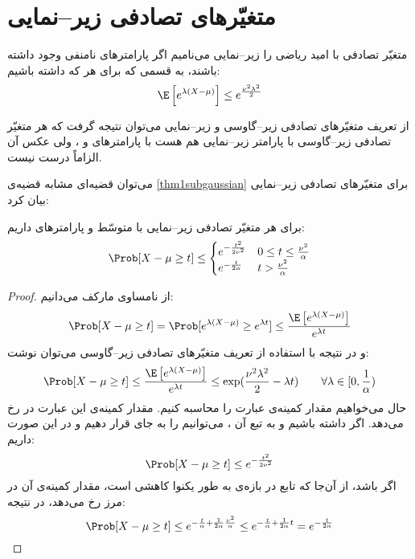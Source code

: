 	\section{متغیّرهای تصادفی زیر--نمایی}
	\begin{den}
		متغیّر تصادفی
		با امید ریاضی
		\lr{$\mu = \E[X]$}
		را زیر--نمایی می‌نامیم اگر پارامترهای نامنفی
		\lr{$(\nu,\alpha)$}
		وجود داشته باشند، به قسمی که برای هر
		\lr{$\lambda$}
		که
		داشته باشیم:
		\[\E\left[e^{\lambda(X-\mu)}\right]\leq e^{\frac{\nu^2\lambda^2}{2}}\]
	\end{den}
	از تعریف متغیّرهای تصادفی زیر--گاوسی و زیر--نمایی می‌توان نتیجه گرفت که هر متغیّر تصادفی زیر--گاوسی با پارامتر
	\lr{$\sigma$}
	زیر--نمایی هم هست با پارامترهای
	\lr{$\nu=\sigma$}
	و
	،
	ولی عکس آن الزاماً درست نیست.
	
	می‌توان قضیه‌ای مشابه قضیه‌ی
	\ref{thm1subgaussian}
	برای متغیّرهای تصادفی زیر--نمایی بیان کرد:
	\begin{thm}
		برای هر متغیّر تصادفی زیر--نمایی با متوسّط
		\lr{$\mu = \E[X]$}
		و پارامترهای
		\lr{$\nu,\alpha$}
		داریم:
		\begin{equation}
		\Prob[X-\mu\geq t] \leq \begin{cases}
		e^{-\frac{t^2}{2\nu^2}} &  0\leq t \leq \frac{\nu^2}{\alpha}\\
		e^{-\frac{t}{2\alpha}} &  t>\frac{\nu^2}{\alpha}\\
		\end{cases}
		\end{equation}
	\end{thm}
	\begin{proof}
		از نامساوی مارکف می‌دانیم:
		\[\Prob[X-\mu\geq t] = \Prob[e^{\lambda(X-\mu)}\geq e^{\lambda t}] \leq \frac{\E\left[e^{\lambda(X-\mu)}\right]}{e^{\lambda t}}\]
		و در نتیجه با استفاده از تعریف متغیّرهای تصادفی زیر--گاوسی می‌توان نوشت:
		\[\Prob[X-\mu\geq t] \leq \frac{\E\left[e^{\lambda(X-\mu)}\right]}{e^{\lambda t}} \leq \exp(\frac{\nu^2\lambda^2}{2} - \lambda t) \qquad \forall \lambda\in[0,\frac{1}{\alpha})\]
		حال می‌خواهیم مقدار کمینه‌ی عبارت
		را محاسبه کنیم. مقدار کمینه‌ی این عبارت در
		رخ می‌دهد. اگر داشته باشیم
		\lr{$\frac{t}{\nu^2}\in[0,\frac{1}{\alpha})$}
		و به تبع آن
		،
		می‌توانیم
		\lr{$\lambda^*$}
		را به جای
		\lr{$\lambda$}
		قرار دهیم و در این صورت داریم:
		\[\Prob[X-\mu\geq t]\leq e^{-\frac{t^2}{2\nu^2}}\]
		اگر 
		باشد، از آن‌جا که تابع
		در بازه‌ی
		\lr{$[0,\lambda^*]$}
		به طور یکنوا کاهشی است، مقدار کمینه‌ی آن در مرز
		رخ می‌دهد، در نتیجه:
		\[\Prob[X-\mu\geq t]\leq e^{-\frac{t}{\alpha} + \frac{1}{2\alpha}\frac{\nu^2}{\alpha}} \leq e^{-\frac{t}{\alpha} + \frac{1}{2\alpha}t} = e^{-\frac{t}{2\alpha}} \]
	\end{proof}
